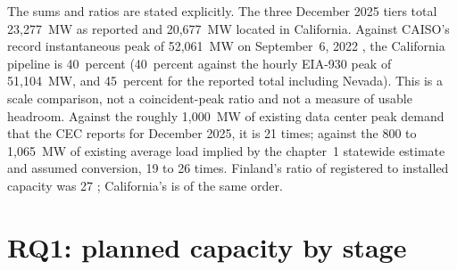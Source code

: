 The sums and ratios are stated explicitly. The three December 2025 tiers total 23,277~MW as reported and 20,677~MW located in California. Against CAISO's record instantaneous peak of 52,061~MW on September~6, 2022 \citep{caiso_keystats}, the California pipeline is 40~percent (40~percent against the hourly EIA-930 peak of 51,104~MW, and 45~percent for the reported total including Nevada). This is a scale comparison, not a coincident-peak ratio and not a measure of usable headroom. Against the roughly 1,000~MW of existing data center peak demand that the CEC reports for December 2025, it is 21 times; against the 800 to 1,065~MW of existing average load implied by the chapter~1 statewide estimate and assumed conversion, 19 to 26 times. Finland's ratio of registered to installed capacity was 27 \citep{manner2026}; California's is of the same order.

\section{RQ1: planned capacity by stage}
\label{sec:rq1}

\begin{table}[H]
\centering\footnotesize
\caption{RQ1: California's planned data center capacity by stage (December 2025, requests located in California) relative to the grid, to existing data center load, and to the adopted forecast's peak and energy growth to 2030; VEA's Nevada requests and the CEC's reported total are memo rows.}
\label{tab:rq1}
\resizebox{\textwidth}{!}{}\\[2pt] 
\end{table}

